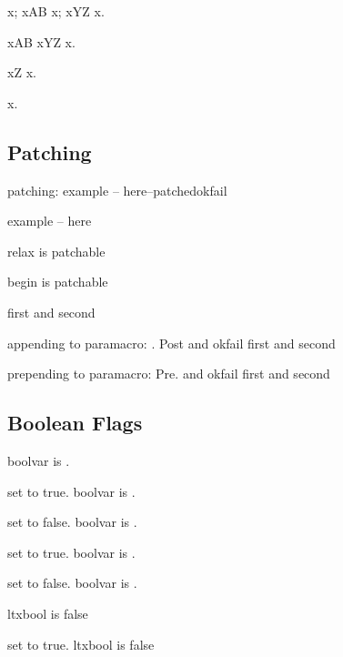 \documentclass{article}
\begin{document}
\newcommand{\mymacro}{x}%
\mymacro;
\appto\mymacro{AB}%
\mymacro;
\appto\mymacro{YZ}%
\mymacro.

\renewcommand{\mymacro}{x}%
\newcommand{\myothermacro}{AB}%
\epreto\mymacro{\myothermacro}%
\renewcommand{\myothermacro}{YZ}%
\eappto\mymacro{\myothermacro}
\mymacro.

\renewcommand{\mymacro}{x}%
\newcommand{\mymacroB}{\mymacroC}%
\newcommand{\mymacroC}{\mymacroD}%
\newcommand{\mymacroD}{Z}%
\eappto\mymacro{\mymacroB}
\mymacro.

\newcommand{\premacro}{x}
\bgroup{}\egroup
\premacro.

\subsection{Patching}
\def\patchme{example -- here}
patching: \patchcmd\patchme{--}{patched}{ok}{fail}

\patchme

relax is  patchable

begin is  patchable

\def\paramacro#1#2{#1 and #2}
\paramacro{first}{second}

appending to paramacro: \apptocmd\paramacro{. Post}{ok}{fail}\newline
\paramacro{first}{second}

prepending to paramacro: \pretocmd\paramacro{Pre. }{ok}{fail}\newline
\paramacro{first}{second}

\subsection{Boolean Flags}

boolvar is .

set to true. boolvar is .

set to false. boolvar is .

set to true. boolvar is .

set to false. boolvar is .

\newtoggle{ltxbool}
ltxbool is \iftoggle{ltxbool}{true}{false}

set to true. ltxbool is \iftoggle{ltxbool}{true}{false}
\end{document}
